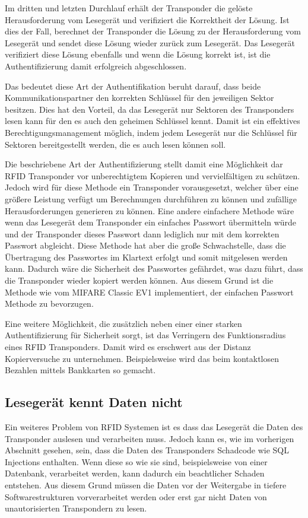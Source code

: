 \documentclass[conference]{IEEEtran}
\begin{document}
Im dritten und letzten Durchlauf erhält der Transponder die gelöste Herausforderung vom Lesegerät und verifiziert die Korrektheit der Lösung. Ist dies der Fall, berechnet der Transponder die Lösung zu der Herausforderung  vom Lesegerät und sendet diese Lösung wieder zurück zum Lesegerät. Das Lesegerät verifiziert diese Lösung ebenfalls und wenn die Lösung korrekt ist, ist die Authentifizierung damit erfolgreich abgeschlossen.

Das bedeutet diese Art der Authentifikation beruht darauf, dass beide Kommunikationspartner den korrekten Schlüssel für den jeweiligen Sektor besitzen. Dies hat den Vorteil, da das Lesegerät nur Sektoren des Transponders lesen kann für den es auch den geheimen Schlüssel kennt. Damit ist ein effektives Berechtigungsmanagement möglich, indem jedem Lesegerät nur die Schlüssel für Sektoren bereitgestellt werden, die es auch lesen können soll.

Die beschriebene Art der Authentifizierung stellt damit eine Möglichkeit dar RFID Transponder vor unberechtigtem Kopieren und vervielfältigen zu schützen. Jedoch wird für diese Methode ein Transponder vorausgesetzt, welcher über eine größere Leistung verfügt um Berechnungen durchführen zu können und zufällige Herausforderungen generieren zu können. Eine andere einfachere Methode wäre wenn das Lesegerät dem Transponder ein einfaches Passwort übermitteln würde und der Transponder dieses Passwort dann lediglich nur mit dem korrekten Passwort abgleicht. Diese Methode hat aber die große Schwachstelle, dass die Übertragung des Passwortes im Klartext erfolgt und somit mitgelesen werden kann. Dadurch wäre die Sicherheit des Passwortes gefährdet, was dazu führt, dass die Transponder wieder kopiert werden können. Aus diesem Grund ist die Methode wie vom MIFARE Classic EV1 implementiert, der einfachen Passwort Methode zu bevorzugen.

Eine weitere Möglichkeit, die zusätzlich neben einer einer starken Authentifizierung für Sicherheit sorgt, ist das Verringern des Funktionsradius eines RFID Transponders. Damit wird es erschwert aus der Distanz Kopierversuche zu unternehmen. Beispielsweise wird das beim kontaktlosen Bezahlen mittels Bankkarten so gemacht.

\subsection{Lesegerät kennt Daten nicht}
Ein weiteres Problem von RFID Systemen ist es dass das Lesegerät die Daten des Transponder auslesen und verarbeiten muss. Jedoch kann es, wie im vorherigen Abschnitt gesehen, sein, dass die Daten des Transponders Schadcode wie SQL Injections enthalten. Wenn diese so wie sie sind, beispielsweise von einer Datenbank, verarbeitet werden, kann dadurch ein beachtlicher Schaden entstehen. Aus diesem Grund müssen die Daten vor der Weitergabe in tiefere Softwarestrukturen vorverarbeitet werden oder erst gar nicht Daten von unautorisierten Transpondern zu lesen.
\end{document}
